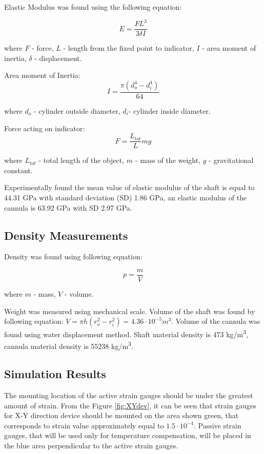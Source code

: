 Elastic Modulus was found using the following equation:

\begin{equation}
E = \frac{FL^3}{3 \delta I} 
\end{equation}

where $F$ - force, $L$ - length from the fixed point to indicator, $I$ - area moment of inertia, $\delta$ - displacement.

Area moment of Inertia: 
\begin{equation}
I = \frac{\pi (d_o^4 - d_i^4)}{64}
\end{equation}

where $d_o$ - cylinder outside diameter, $d_i$- cylinder inside diameter.

Force acting on indicator:
\begin{equation}
F = \frac{L_{tot}}{L}mg
\end{equation}

where $L_{tot}$ - total length of the object, $m$ - mass of the weight, $g$ - gravitational constant.

Experimentally found the mean value of elastic modulus of the shaft is equal to 44.31 GPa with standard deviation (SD) 1.86 GPa, an elastic modulus of the cannula is 63.92 GPa with SD 2.97 GPa.

	\subsection{Density Measurements}
	\label{sec:DenMeas}
Density was found using following equation:

\begin{equation}
p=\frac{m}{V}
\end{equation}

where $m$ - mass, $V$ - volume.

Weight was measured using mechanical scale. Volume of the shaft was found by following equation: $V =  \pi h(r_o^2-r_i^2) = 4.36 \cdot 10^{-5} m^3$. Volume of the cannula was found using water displacement method. Shaft material density is 473 kg/m\textsuperscript{3}, cannula material density is 55238 kg/m\textsuperscript{3}.

\subsection{Simulation Results}
\label{sec:FEAres}
The mounting location of the active strain gauges should be under the greatest amount of strain. From the Figure \ref{fig:XYdev}, it can be seen that strain gauges for X-Y direction device should be mounted on the area shown green, that corresponds to strain value approximately equal to $1.5 \cdot 10^{-4}$. Passive strain gauges, that will be used only for temperature compensation, will be placed in the blue area perpendicular to the active strain gauges.

